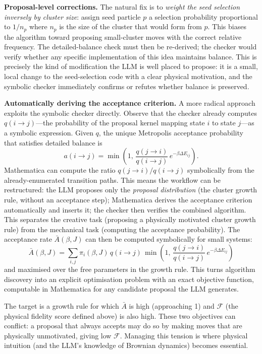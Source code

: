 \documentclass[10.5pt]{article}
\begin{document}
\textbf{Proposal-level corrections.}  The natural fix is to \emph{weight
the seed selection inversely by cluster size}: assign seed particle $p$
a selection probability proportional to $1/n_p$ where $n_p$ is the size
of the cluster that would form from $p$.  This biases the algorithm
toward proposing small-cluster moves with the correct relative frequency.
The detailed-balance check must then be re-derived; the checker
would verify whether any specific implementation of this idea maintains
balance.  This is precisely the kind of modification the LLM is well
placed to propose: it is a small, local change to the seed-selection code
with a clear physical motivation, and the symbolic checker immediately
confirms or refutes whether balance is preserved.

\textbf{Automatically deriving the acceptance criterion.}  A more
radical approach exploits the symbolic checker directly.  Observe that
the checker already computes $q(i \to j)$---the probability of the
proposal kernel mapping state $i$ to state $j$---as a symbolic
expression.  Given $q$, the unique Metropolis acceptance probability
that satisfies detailed balance is
\[
  a(i \to j) = \min\!\left(1,\,
    \frac{q(j \to i)}{q(i \to j)}\,e^{-\beta\Delta E_{ij}}
  \right).
\]
Mathematica can compute the ratio $q(j \to i)/q(i \to j)$ symbolically
from the already-enumerated transition paths.  This means the workflow
can be restructured: the LLM proposes only the \emph{proposal
distribution} (the cluster growth rule, without an acceptance step);
Mathematica derives the acceptance criterion automatically and inserts
it; the checker then verifies the combined algorithm.  This separates
the creative task (proposing a physically motivated cluster growth rule)
from the mechanical task (computing the acceptance probability).  The
acceptance rate $\bar{A}(\beta, J)$ can then be computed symbolically
for small systems:
\[
  \bar{A}(\beta, J) = \sum_{i,j} \pi_i(\beta,J)\, q(i \to j)\,
    \min\!\left(1,\, \frac{q(j \to i)}{q(i \to j)}\,e^{-\beta\Delta E_{ij}}
    \right)
\]
and maximised over the free parameters in the growth rule.  This turns
algorithm discovery into an explicit optimisation problem with an exact
objective function, computable in Mathematica for any candidate proposal
the LLM generates.

The target is a growth rule for which $\bar{A}$ is high (approaching 1)
and $\mathcal{F}$ (the physical fidelity score defined above) is also
high.  These two objectives can conflict: a proposal that always accepts
may do so by making moves that are physically unmotivated, giving low
$\mathcal{F}$.  Managing this tension is where physical intuition (and
the LLM's knowledge of Brownian dynamics) becomes essential.
\end{document}
